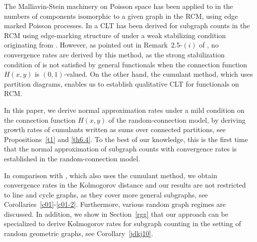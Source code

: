 \documentclass[bj,authoryear,noshowframe]{imsart}
\theoremstyle{plain}
\theoremstyle{remark}
\begin{document}
   The Malliavin-Stein machinery on Poisson space \cite{lastpeccatipenrose} has been applied to in \cite{LNS21} the numbers of components isomorphic to a given graph in the RCM, using edge marked Poisson processes.
   In \cite{can2022} a CLT has been derived for subgraph counts in the RCM
   using edge-marking structure of \cite{LNS21} 
   under a weak stabilizing condition originating from \cite{penrose01}. 
   However, as pointed out in Remark~2.5-$(i)$ of \cite{can2022},
   no convergence rates are derived by this method, as 
   the strong stabilization condition of \cite{penrose05,lachiezerey4}
   is not satisfied by general functionals
   when the connection function $H(x,y)$ is $(0,1)$-valued. 
 On the other hand, the cumulant method, which uses partition diagrams, enables us to establish qualitative CLT for functionals on RCM. %


 In this paper, we derive normal approximation rates under a mild condition
 on the connection function $H(x,y)$ of the random-connection model,
 by deriving growth rates of cumulants written as sums over
 connected partitions, see Propositions~\ref{t1} and \ref{th6.4}. 
 To the best of our knowledge, this is the first time that the normal approximation
 of subgraph counts with convergence rates is established
 in the random-connection model.
 

 In comparison with \cite{khorunzhiy}, which also uses the cumulant method, 
 we obtain convergence rates in the Kolmogorov distance and our results are 
 not restricted to line and cycle graphs, as they cover more general subgraphs,
 see Corollaries~\ref{c01}-\ref{c01-2}. 
 Furthermore, various random graph regimes are discussed.
 In addition,
   we show in Section~\ref{rgg} that our approach can be
   specialized to derive Kolmogorov rates for
   subgraph counting in the setting of random geometric graphs,
   see Corollary~\ref{jdkj10}. 
 
\end{document}
